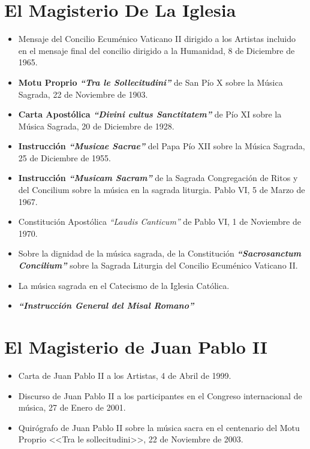 \documentclass[letterpaper, 12pt]{book}
\begin{document}
    \section{El Magisterio De La Iglesia}
    
    \begin{itemize}
        \item Mensaje del Concilio Ecum\'enico Vaticano II dirigido a los Artistas incluido en el mensaje final del concilio dirigido a la Humanidad, 8 de Diciembre de 1965.
        \item \textbf{Motu Proprio \textit{``Tra le Sollecitudini''}} de San P\'io X sobre la M\'usica Sagrada, 22 de Noviembre de 1903.
        \item \textbf{Carta Apost\'olica \textit{``Divini cultus Sanctitatem''}} de P\'io XI sobre la M\'usica Sagrada, 20 de Diciembre de 1928.
        \item \textbf{Instrucci\'on \textit{``Musicae Sacrae''}} del Papa P\'io XII sobre la M\'usica Sagrada, 25 de Diciembre de 1955.
        \item \textbf{Instrucci\'on \textit{``Musicam Sacram''}} de la Sagrada Congregaci\'on de Ritos y del Concilium sobre la m\'usica en la sagrada liturgia. Pablo VI, 5 de Marzo de 1967.
        \item Constituci\'on Apost\'olica \textit{``Laudis Canticum''} de Pablo VI, 1 de Noviembre de 1970.
        \item Sobre la dignidad de la m\'usica sagrada, de la Constituci\'on \textbf{\textit{``Sacrosanctum Concilium''}} sobre la Sagrada Liturgia del Concilio Ecum\'enico Vaticano II.
        \item La m\'usica sagrada en el Catecismo de la Iglesia Cat\'olica.
        \item \textbf{\textit{``Instrucci\'on General del Misal Romano''}}
    \end{itemize}
    
    \section{El Magisterio de Juan Pablo II}
    
    \begin{itemize}
        \item Carta de Juan Pablo II a los Artistas, 4 de Abril de 1999.
        \item Discurso de Juan Pablo II a los participantes en el Congreso internacional de m\'usica, 27 de Enero de 2001.
        \item Quir\'ografo de Juan Pablo II sobre la m\'usica sacra en el centenario del Motu Proprio <<Tra le sollecitudini>>, 22 de Noviembre de 2003.
    \end{itemize}
    
\end{document}
